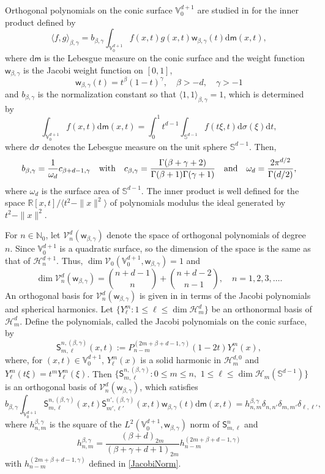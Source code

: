 \documentclass{amsart}
\theoremstyle{remark}
\def\la{{\langle}}
\def\ra{{\rangle}}
\def\d{\mathrm{d}}
\def\sph{{\mathbb{S}^{d-1}}}
\def\sm{{\mathsf m}}
\def\sw{{\mathsf w}}
\def\sS{{\mathsf S}}
\def\b{{\beta}}
\def\g{{\gamma}}
\def\s{\sigma}
\def\la{{\langle}}
\def\ra{{\rangle}}
\def\CH{{\mathcal H}}
\def\CV{{\mathcal V}}
\def\NN{{\mathbb N}}
\def\RR{{\mathbb R}}
\def\VV{{\mathbb V}}
\begin{document}
Orthogonal polynomials on the conic surface $\VV_0^{d+1}$ are studied in \cite{X20} for the inner product
defined by
\begin{equation}\label{ConeInnerProduct}
  \la f, g \ra_{\b,\g} = b_{\b,\g} \int_{\VV_0^{d+1}} f(x,t) g(x,t) \sw_{\b,\g}(t) \d \sm (x,t),
\end{equation}
where $\d \sm$ is the Lebesgue measure on the conic surface and the weight function $\sw_{\b,\g}$ is the
Jacobi weight function on $[0,1]$,
$$
\sw_{\b,\g}(t) = t^\b (1-t)^\g, \quad \b > -d, \quad \g > -1
$$
and $b_{\b,\g}$ is the normalization constant so that $\la 1, 1 \ra_{\b,\g} =1$, which is determined by
$$
 \int_{\VV_0^{d+1}} f(x,t) \d \sm(x,t) = \int_{0}^1 t^{d-1}  \int_{\sph} f(t \xi,t)\d \s(\xi) \d t,
$$
where $\d \s$ denotes the Lebesgue measure on the unit sphere $\sph$. Then,
$$
b_{\beta,\gamma}= \frac{1}{\omega_d} c_{\b+d-1,\g} \quad \hbox{with}\quad
c_{\b,\g} = \frac{\Gamma(\beta+\gamma+2)}{\Gamma(\beta+1)\Gamma(\gamma+1)} \quad \hbox{and}\quad
\omega_{d}=\frac{2\pi^{d/2}}{\Gamma(d/2)},
$$
where $\omega_{d}$ is the surface area of $\sph$. The inner product is well defined
for the space $\RR[x,t] / \la t^2 - \|x\|^2\ra$ of polynomials modulus the ideal generated by $t^2 -\|x\|^2$.

For $n \in \NN_0$, let $\CV_n^d(\sw_{\b,\g})$ denote the space of orthogonal polynomials of degree $n$. Since
$\VV_0^{d+1}$ is a quadratic surface, so the dimension of the space is the same as that of $\CH_n^{d+1}$.
Thus, $\dim \CV_0(\VV_0^{d+1},\sw_{\b,\g}) =1$ and
$$
   \dim \CV_n^d(\sw_{\b,\g})  = \binom{n+d-1}{n}+\binom{n+d-2}{n-1},\quad n=1,2,3,\ldots.
$$
An orthogonal basis for $\CV_n^d(\sw_{\b,\g})$ is given in \cite{X20} in terms of the Jacobi polynomials and
spherical harmonics. Let $\{Y_\ell^m: 1 \le \ell \le \dim \CH_m^d\}$ be an orthonormal basis of $\CH_m^d$.
Define the polynomials, called the Jacobi polynomials on the conic surface, by
\begin{equation} \label{eq:sfOPbasis}
  \sS_{m, \ell}^{n,(\b,\g)} (x,t) := P_{n-m}^{(2m + \b + d-1,\g)} (1-2t) Y_\ell^m (x),
\end{equation}
where, for $(x,t) \in \VV_0^{d+1}$, $Y_\ell^m(x)$ is a solid harmonic in $\CH_m^{d,0}$ and
$Y_\ell^m (t\xi) = t^m Y_\ell^m(\xi)$. Then
$\{ \sS_{m, \ell}^{n,(\b,\g)}: 0 \le m \le n, \,\, 1 \le \ell \le \dim \CH_m(\sph)\}$ is an orthogonal basis of
$\CV_n^d(\sw_{\b,\g})$, which satisfies
$$
 b_{\b,\g} \int_{\VV_0^{d+1}}  \sS_{m, \ell}^{n,(\b,\g)}  (x,t) \sS_{m', \ell'}^{n',(\b,\g)} (x,t)
     \sw_{\b,\g}(t)  \d \sm (x,t) =  h_{n,m}^{\b,\g}\delta_{n,n'}\delta_{m,m'}\delta_{\ell,\ell'},
$$
where $h_{n,m}^{\b,\g}$ is the square of the $L^2(\VV_0^{d+1},\sw_{\b,\g})$ norm of $\sS_{m, \ell}^n$ and
\begin{equation}\label{eq:Snorm}
   h_{n,m}^{\b,\g} = \frac{(\b+d)_{2m}}{(\b+\g+d+1)_{2m}} h_{n-m}^{(2m+\b+d-1,\g)}
\end{equation}
with $h_{n-m}^{(2m+\b+d-1,\g)}$ defined in \eqref{JacobiNorm}.
\end{document}
